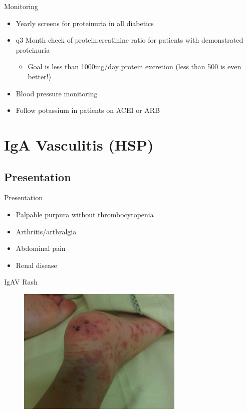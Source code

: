 \begin{frame}{Monitoring}

\begin{itemize}
\itemsep1pt\parskip0pt
\item
  Yearly screens for proteinuria in all diabetics
\item
  q3 Month check of protein:creatinine ratio for patients with
  demonstrated proteinuria

  \begin{itemize}
  \itemsep1pt\parskip0pt
  \item
    Goal is less than 1000mg/day protein excretion (less than 500 is
    even better!)
  \end{itemize}
\item
  Blood pressure monitoring
\item
  Follow potassium in patients on ACEI or ARB
\end{itemize}

\end{frame}

\section{IgA Vasculitis (HSP)}\label{iga-vasculitis-hsp}

\frame{\tableofcontents[hideothersubsections]}

\subsection{Presentation}\label{presentation}

\begin{frame}{Presentation}

\begin{itemize}
\itemsep1pt\parskip0pt
\item
  Palpable purpura without thrombocytopenia
\item
  Arthritis/arthralgia
\item
  Abdominal pain
\item
  Renal disease
\end{itemize}

\end{frame}

\begin{frame}{IgAV Rash}

\begin{figure}
\includegraphics[scale=0.5]{./img/SknlsnHnchSchnlnprpIgA.jpg}
\end{figure}

\end{frame}

